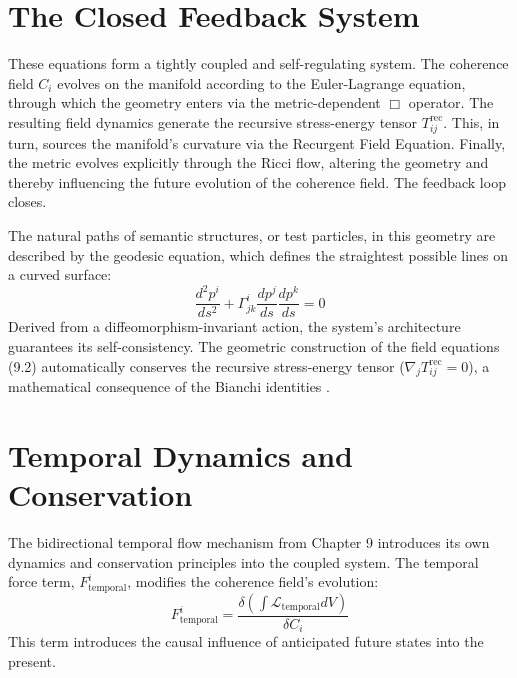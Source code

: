 
\section{The Closed Feedback System}
\label{sec:the_closed_feedback_system}

These equations form a tightly coupled and self-regulating system. The coherence field \(C_i\) evolves on the manifold according to the Euler-Lagrange equation, through which the geometry enters via the metric-dependent \(\Box\) operator. The resulting field dynamics generate the recursive stress-energy tensor \(T^{\text{rec}}_{ij}\). This, in turn, sources the manifold's curvature via the Recurgent Field Equation. Finally, the metric evolves explicitly through the Ricci flow, altering the geometry and thereby influencing the future evolution of the coherence field. The feedback loop closes.

The natural paths of semantic structures, or test particles, in this geometry are described by the geodesic equation, which defines the straightest possible lines on a curved surface:
\begin{equation}
\frac{d^2 p^i}{ds^2} + \Gamma^i_{jk} \frac{dp^j}{ds} \frac{dp^k}{ds} = 0
\end{equation}
Derived from a diffeomorphism-invariant action, the system's architecture guarantees its self-consistency. The geometric construction of the field equations (9.2) automatically conserves the recursive stress-energy tensor ($\nabla_j T^{\text{rec}}_{ij} = 0$), a mathematical consequence of the Bianchi identities \autocite{Bianchi1902}.


\section{Temporal Dynamics and Conservation}
\label{sec:temporal_dynamics_and_conservation}

The bidirectional temporal flow mechanism from Chapter 9 introduces its own dynamics and conservation principles into the coupled system. The temporal force term, \(F^i_{\text{temporal}}\), modifies the coherence field's evolution:
\begin{equation}
F^i_{\text{temporal}} = \frac{\delta(\int \mathcal{L}_{\text{temporal}} dV)}{\delta C_i}
\end{equation}
This term introduces the causal influence of anticipated future states into the present.

